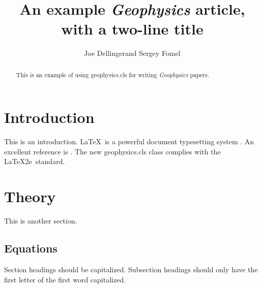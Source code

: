 \documentclass[manuscript,endfloat]{geophysics}
\begin{document}
\title{An example \emph{Geophysics} article, \\ with a two-line title}

\renewcommand{\thefootnote}{\fnsymbol{footnote}} 

\address{
\footnotemark[1]BP UTG, \\
200 Westlake Park Blvd, \\
Houston, TX, 77079 \\
\footnotemark[2]Bureau of Economic Geology, \\
John A. and Katherine G. Jackson School of Geosciences \\
The University of Texas at Austin \\
University Station, Box X \\
Austin, TX 78713-8924}
\author{Joe Dellinger\footnotemark[1] and Sergey Fomel\footnotemark[2]}


\maketitle

\begin{abstract}
  This is an example of using \textsf{geophysics.cls} for writing
  \emph{Geophysics} papers.
\end{abstract}

\section{Introduction}

This is an introduction. \LaTeX\ is a powerful document typesetting
system \cite[]{lamport}. An excellent reference is \cite[]{kopka}. The
new \textsf{geophysics.cls} class complies with the \LaTeX2e\
standard.

\section*{Theory}

This is another section. 

\subsection{Equations}

Section headings should be capitalized. Subsection headings should only
have the first letter of the first word capitalized.
\end{document}
